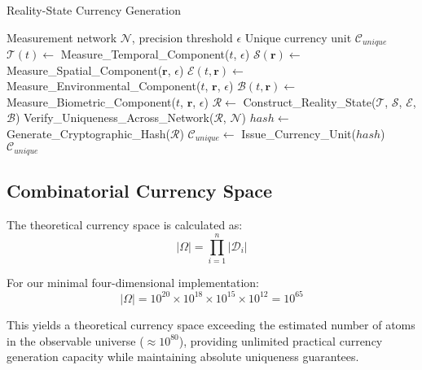 \documentclass[12pt,a4paper]{article}
\begin{document}
\begin{algorithm}
\caption{Reality-State Currency Generation}
\begin{algorithmic}[1]
\Require Measurement network $\mathcal{N}$, precision threshold $\epsilon$
\Ensure Unique currency unit $\mathcal{C}_{unique}$
\State $\mathcal{T}(t) \leftarrow$ Measure\_Temporal\_Component($t$, $\epsilon$)
\State $\mathcal{S}(\mathbf{r}) \leftarrow$ Measure\_Spatial\_Component($\mathbf{r}$, $\epsilon$)
\State $\mathcal{E}(t,\mathbf{r}) \leftarrow$ Measure\_Environmental\_Component($t$, $\mathbf{r}$, $\epsilon$)
\State $\mathcal{B}(t,\mathbf{r}) \leftarrow$ Measure\_Biometric\_Component($t$, $\mathbf{r}$, $\epsilon$)
\State $\mathcal{R} \leftarrow$ Construct\_Reality\_State($\mathcal{T}$, $\mathcal{S}$, $\mathcal{E}$, $\mathcal{B}$)
\State Verify\_Uniqueness\_Across\_Network($\mathcal{R}$, $\mathcal{N}$)
\State $hash \leftarrow$ Generate\_Cryptographic\_Hash($\mathcal{R}$)
\State $\mathcal{C}_{unique} \leftarrow$ Issue\_Currency\_Unit($hash$)
\Return $\mathcal{C}_{unique}$
\end{algorithmic}
\end{algorithm}

\subsection{Combinatorial Currency Space}

The theoretical currency space is calculated as:
\begin{equation}
|\Omega| = \prod_{i=1}^{n} |\mathcal{D}_i|
\end{equation}

For our minimal four-dimensional implementation:
\begin{equation}
|\Omega| = 10^{20} \times 10^{18} \times 10^{15} \times 10^{12} = 10^{65}
\end{equation}

This yields a theoretical currency space exceeding the estimated number of atoms in the observable universe ($\approx 10^{80}$), providing unlimited practical currency generation capacity while maintaining absolute uniqueness guarantees.
\end{document}
